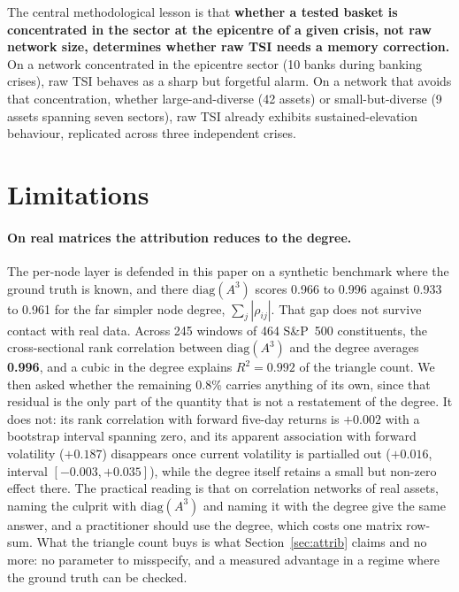 \documentclass[11pt,a4paper]{article}
\begin{document}
The central methodological lesson is that \textbf{whether a tested basket is
concentrated
in the sector at the epicentre of a given crisis, not raw network size,
determines whether raw TSI needs a memory correction.} On a network
concentrated in the epicentre sector (10 banks during banking crises), raw
TSI behaves as a sharp but forgetful alarm. On a network that avoids
that concentration, whether large-and-diverse (42 assets) or
small-but-diverse (9 assets spanning seven sectors), raw TSI already
exhibits sustained-elevation behaviour, replicated across three independent
crises.


\section{Limitations}
\label{sec:limits}

\paragraph{On real matrices the attribution reduces to the degree.}
The per-node layer is defended in this paper on a synthetic benchmark where the
ground truth is known, and there $\mathrm{diag}(A^3)$ scores 0.966 to 0.996
against 0.933 to 0.961 for the far simpler node degree, $\sum_j |\rho_{ij}|$.
That gap does not survive contact with real data. Across 245 windows of 464
S\&P~500 constituents, the cross-sectional rank correlation between
$\mathrm{diag}(A^3)$ and the degree averages \textbf{0.996}, and a cubic in the
degree explains $R^2 = 0.992$ of the triangle count. We then asked whether the
remaining 0.8\% carries anything of its own, since that residual is the only
part of the quantity that is not a restatement of the degree. It does not: its
rank correlation with forward five-day returns is $+0.002$ with a bootstrap
interval spanning zero, and its apparent association with forward volatility
($+0.187$) disappears once current volatility is partialled out ($+0.016$,
interval $[-0.003, +0.035]$), while the degree itself retains a small but
non-zero effect there. The practical reading is that on correlation networks of
real assets, naming the culprit with $\mathrm{diag}(A^3)$ and naming it with the
degree give the same answer, and a practitioner should use the degree, which
costs one matrix row-sum. What the triangle count buys is what
Section~\ref{sec:attrib} claims and no more: no parameter to misspecify, and a
measured advantage in a regime where the ground truth can be checked.
\end{document}
